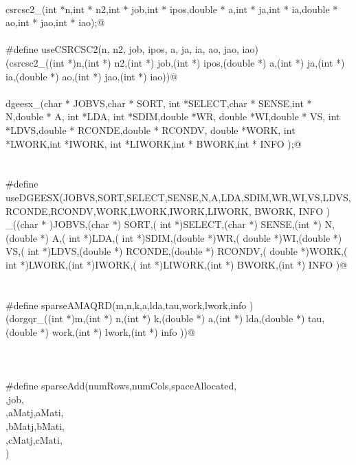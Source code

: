 \documentclass[12pt]{article}
\begin{document}
\begin{flushleft}
\begin{minipage}{\linewidth}
\begin{list}{}{}
\mbox{}\verb@@\\
\mbox{}\verb@int csrcsc2_(int *n,int * n2,int * job,int * ipos,double *  a,int *  ja,int * ia,double * ao,int *  jao,int *  iao);@\\
\mbox{}\verb@@\\
\mbox{}\verb@#define  useCSRCSC2(n, n2, job, ipos,  a,  ja, ia, ao,  jao,  iao)\@\\
\mbox{}\verb@(csrcsc2_((int *)n,(int *) n2,(int *) job,(int *) ipos,(double *)  a,(int *)  ja,(int *) ia,(double *) ao,(int *)  jao,(int *)  iao))@\\
\mbox{}\verb@@\\
\mbox{}\verb@void dgeesx_(char * JOBVS,char * SORT, int *SELECT,char * SENSE,int * N,double * A, int *LDA, int *SDIM,double *WR, double *WI,double * VS, int *LDVS,double * RCONDE,double * RCONDV, double *WORK, int *LWORK,int *IWORK, int *LIWORK,int * BWORK,int * INFO );@\\
\mbox{}\verb@@\\
\mbox{}\verb@@\\
\mbox{}\verb@#define useDGEESX(JOBVS,SORT,SELECT,SENSE,N,A,LDA,SDIM,WR,WI,VS,LDVS,RCONDE,RCONDV,WORK,LWORK,IWORK,LIWORK, BWORK, INFO )\@\\
\mbox{}\verb@dgeesx_((char * )JOBVS,(char *) SORT,( int *)SELECT,(char *) SENSE,(int *) N,(double *) A,( int *)LDA,( int *)SDIM,(double *)WR,( double *)WI,(double *) VS,( int *)LDVS,(double *) RCONDE,(double *) RCONDV,( double *)WORK,( int *)LWORK,(int *)IWORK,( int *)LIWORK,(int *) BWORK,(int *) INFO )@\\
\mbox{}\verb@@\\
\mbox{}\verb@@\\
\mbox{}\verb@#define sparseAMAQRD(m,n,k,a,lda,tau,work,lwork,info )\@\\
\mbox{}\verb@(dorgqr_((int *)m,(int *) n,(int *) k,(double *) a,(int *) lda,(double *) tau,(double *) work,(int *) lwork,(int *) info ))@\\
\mbox{}\verb@@\\
\mbox{}\verb@@\\
\mbox{}\verb@@\\
\mbox{}\verb@#define sparseAdd(numRows,numCols,spaceAllocated, \@\\
\mbox{}\verb@workSpace,job, \@\\
\mbox{}\verb@aMat,aMatj,aMati, \@\\
\mbox{}\verb@bMat,bMatj,bMati, \@\\
\mbox{}\verb@cMat,cMatj,cMati, \@\\
\mbox{}\verb@errCode) \@\\

\end{list}
\end{minipage}
\end{flushleft}
\end{document}
